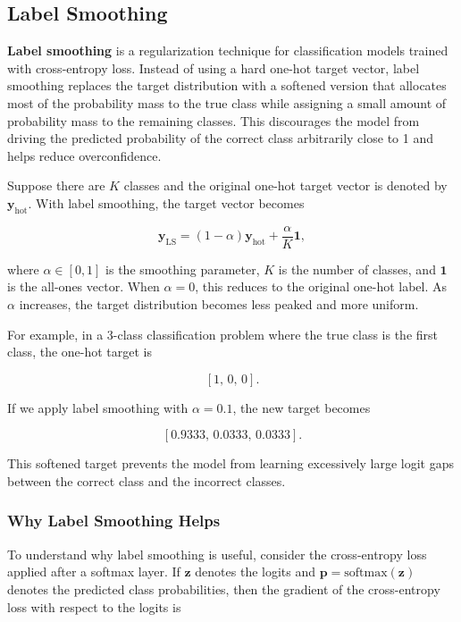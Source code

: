 \documentclass{article}
\begin{document}
\subsection{Label Smoothing}

\textbf{Label smoothing} is a regularization technique for classification models trained with cross-entropy loss. Instead of using a hard one-hot target vector, label smoothing replaces the target distribution with a softened version that allocates most of the probability mass to the true class while assigning a small amount of probability mass to the remaining classes. This discourages the model from driving the predicted probability of the correct class arbitrarily close to 1 and helps reduce overconfidence.

Suppose there are \(K\) classes and the original one-hot target vector is denoted by \(\mathbf{y}_{\text{hot}}\). With label smoothing, the target vector becomes

\[
\mathbf{y}_{\text{LS}} = (1-\alpha)\mathbf{y}_{\text{hot}} + \frac{\alpha}{K}\mathbf{1},
\]

where \(\alpha \in [0,1]\) is the smoothing parameter, \(K\) is the number of classes, and \(\mathbf{1}\) is the all-ones vector. When \(\alpha = 0\), this reduces to the original one-hot label. As \(\alpha\) increases, the target distribution becomes less peaked and more uniform.

For example, in a 3-class classification problem where the true class is the first class, the one-hot target is

\[
[1,\,0,\,0].
\]

If we apply label smoothing with \(\alpha = 0.1\), the new target becomes

\[
[0.9333,\,0.0333,\,0.0333].
\]

This softened target prevents the model from learning excessively large logit gaps between the correct class and the incorrect classes.

\subsubsection*{Why Label Smoothing Helps}

To understand why label smoothing is useful, consider the cross-entropy loss applied after a softmax layer. If \(\mathbf{z}\) denotes the logits and \(\mathbf{p}=\text{softmax}(\mathbf{z})\) denotes the predicted class probabilities, then the gradient of the cross-entropy loss with respect to the logits is
\end{document}
